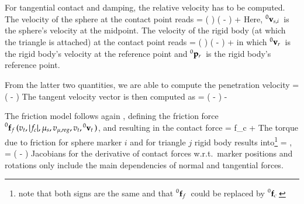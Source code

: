For tangential contact and damping, the relative velocity has to be computed.
The velocity of the sphere at the contact point reads
\be
   = \left(   \right) \times \left(  -   \right) 
  + 
\ee
Here, $\prescript{0}{}{\mathbf{v}_{s,i}}\,$ is the sphere's velocity at the midpoint.
The velocity of the rigid body (at which the triangle is attached) at the contact point reads
\be
   = \left(   \right) \times \left(  -   \right) 
  + 
\ee
in which $\prescript{0}{}{\mathbf{v}_{r}}\,$ is the rigid body's velocity at the reference point and $\prescript{0}{}{\mathbf{p}_r}\,$ is the rigid body's reference point.

From the latter two quantities, we are able to compute the penetration velocity
\be
  \dot \Delta =  \left(  -  \right)
\ee
The tangent velocity vector is then computed as 
\be
   = \left(  -  \right) - \dot \Delta {}
\ee

The friction model follows again , defining the friction force $\prescript{0}{}{\mathbf{f}_f}\,(v_t, |f_c|, \mu_s, v_{\mu,reg}, v_t, \prescript{0}{}{\mathbf{v}_t}\, )$, and resulting in the contact force
\be
   = f_c \cdot {} + 
  \eqDot
\ee
The torque due to friction for sphere marker $i$ and for triangle $j$ rigid body results into\footnote{note that both signs are the same and that $\prescript{0}{}{\mathbf{f}_f}\,$ could be replaced by $\prescript{0}{}{\mathbf{f}_c}\,$}
\be
   =  \times {}, \quad
   = \left(   -  \right) \times {}
  \eqDot
\ee
Jacobians for the derivative of contact forces w.r.t.\ marker positions and rotations only include the main dependencies of normal and tangential forces.

